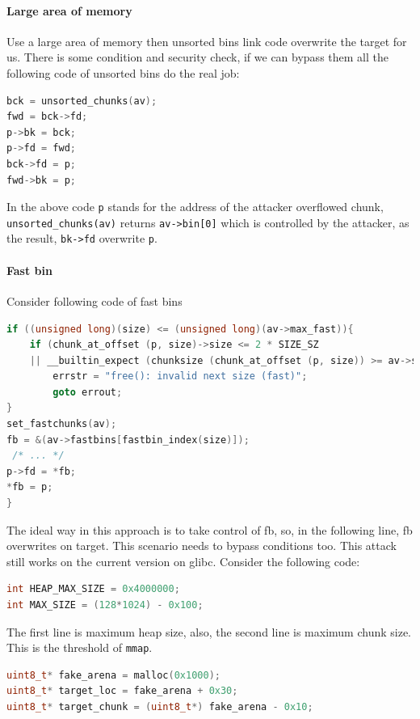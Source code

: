 \documentclass{masterthesis}
\newcommand*\libc{glibc}
\newcommand*\fb{fast bins}
\newcommand*\ub{unsorted bins}
\newcommand*\mmapc{\lstinline{mmap}\xspace}
\begin{document}
\paragraph*{Large area of memory}
Use a large area of memory then \ub{} link code overwrite the target for us. There is some condition and security check, if we can bypass them all the following code of \ub{} do the real job:
\begin{lstlisting}[language=c,frame=tlrb]
bck = unsorted_chunks(av);
fwd = bck->fd;
p->bk = bck;
p->fd = fwd;
bck->fd = p;
fwd->bk = p;
\end{lstlisting}

In the above code \lstinline{p} stands for the address of the attacker overflowed chunk, \lstinline{unsorted_chunks(av)} returns \lstinline{av->bin[0]} which is controlled by the attacker, as the result, \lstinline{bk->fd} overwrite \lstinline{p}.

\paragraph*{Fast bin}
Consider following code of \fb{}
\begin{lstlisting}[language=c,frame=tlrb]
if ((unsigned long)(size) <= (unsigned long)(av->max_fast)){
	if (chunk_at_offset (p, size)->size <= 2 * SIZE_SZ
	|| __builtin_expect (chunksize (chunk_at_offset (p, size)) >= av->system_mem, 0)){
		errstr = "free(): invalid next size (fast)";
		goto errout;
}
set_fastchunks(av);
fb = &(av->fastbins[fastbin_index(size)]);
 /* ... */
p->fd = *fb;
*fb = p;
}

 \end{lstlisting}
The ideal way in this approach is to take control of fb, so, in the following line, fb overwrites on target. This scenario needs to bypass conditions too. This attack still works on the current version on \libc{}. Consider the following code:
\begin{lstlisting}[language=c,frame=tlrb]
int HEAP_MAX_SIZE = 0x4000000;
int MAX_SIZE = (128*1024) - 0x100;
\end{lstlisting}

The first line is maximum heap size, also, the second line is maximum chunk size. This is the threshold of \mmapc{}.
\begin{lstlisting}[language=c,frame=tlrb]
uint8_t* fake_arena = malloc(0x1000);
uint8_t* target_loc = fake_arena + 0x30;
uint8_t* target_chunk = (uint8_t*) fake_arena - 0x10;
\end{lstlisting}
\end{document}
